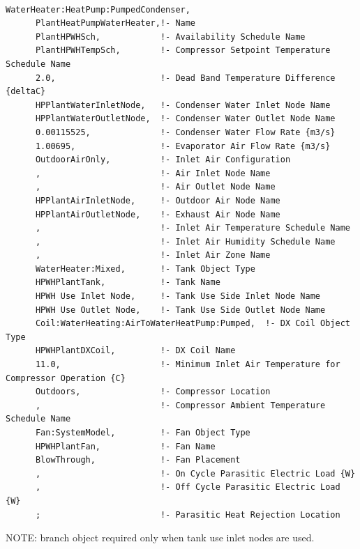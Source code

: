 \begin{lstlisting}

WaterHeater:HeatPump:PumpedCondenser,
      PlantHeatPumpWaterHeater,!- Name
      PlantHPWHSch,            !- Availability Schedule Name
      PlantHPWHTempSch,        !- Compressor Setpoint Temperature Schedule Name
      2.0,                     !- Dead Band Temperature Difference {deltaC}
      HPPlantWaterInletNode,   !- Condenser Water Inlet Node Name
      HPPlantWaterOutletNode,  !- Condenser Water Outlet Node Name
      0.00115525,              !- Condenser Water Flow Rate {m3/s}
      1.00695,                 !- Evaporator Air Flow Rate {m3/s}
      OutdoorAirOnly,          !- Inlet Air Configuration
      ,                        !- Air Inlet Node Name
      ,                        !- Air Outlet Node Name
      HPPlantAirInletNode,     !- Outdoor Air Node Name
      HPPlantAirOutletNode,    !- Exhaust Air Node Name
      ,                        !- Inlet Air Temperature Schedule Name
      ,                        !- Inlet Air Humidity Schedule Name
      ,                        !- Inlet Air Zone Name
      WaterHeater:Mixed,       !- Tank Object Type
      HPWHPlantTank,           !- Tank Name
      HPWH Use Inlet Node,     !- Tank Use Side Inlet Node Name
      HPWH Use Outlet Node,    !- Tank Use Side Outlet Node Name
      Coil:WaterHeating:AirToWaterHeatPump:Pumped,  !- DX Coil Object Type
      HPWHPlantDXCoil,         !- DX Coil Name
      11.0,                    !- Minimum Inlet Air Temperature for Compressor Operation {C}
      Outdoors,                !- Compressor Location
      ,                        !- Compressor Ambient Temperature Schedule Name
      Fan:SystemModel,         !- Fan Object Type
      HPWHPlantFan,            !- Fan Name
      BlowThrough,             !- Fan Placement
      ,                        !- On Cycle Parasitic Electric Load {W}
      ,                        !- Off Cycle Parasitic Electric Load {W}
      ;                        !- Parasitic Heat Rejection Location
\end{lstlisting}

NOTE: branch object required only when tank use inlet nodes are used.


